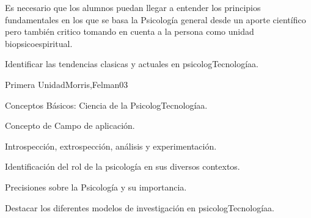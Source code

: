 \begin{syllabus}


\begin{justification}
Es necesario que los alumnos puedan llegar a entender los principios fundamentales en  los que se basa la Psicología general desde un aporte científico pero también critico tomando en cuenta a la persona como unidad biopsicoespiritual.
\end{justification}

\begin{goals}
\item Identificar las tendencias clasicas y actuales en psicologTecnologíaa.
\end{goals}

\begin{outcomes}
\end{outcomes}

\begin{unit}{Primera Unidad}{Morris,Felman}{0}{3}
\begin{topics}
	\item Conceptos Básicos: Ciencia de la PsicologTecnologíaa.
	\item Concepto de Campo de aplicación.
	\item Introspección, extrospección, análisis y experimentación.
\end{topics}
\begin{learningoutcomes}
	\item Identificación del rol de la psicología en sus diversos contextos.
	\item Precisiones sobre la Psicología y su importancia.
	\item Destacar los diferentes modelos de investigación en psicologTecnologíaa.
\end{learningoutcomes}
\end{unit}


\end{syllabus}
